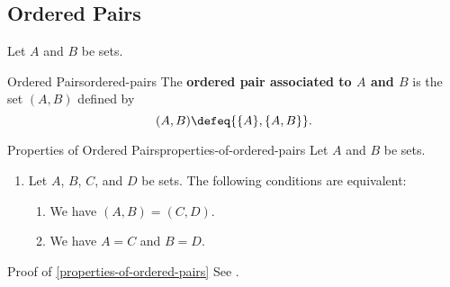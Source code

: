 \subsection{Ordered Pairs}\label{subsection-ordered-pairs}
Let $A$ and $B$ be sets.%
\begin{definition}{Ordered Pairs}{ordered-pairs}%
    The \textbf{ordered pair associated to $A$ and $B$} is the set $(A,B)$ defined by%
    \[
        (A,B)%
        \defeq%
        \{\{A\},\{A,B\}\}.%
    \]%
\end{definition}
\begin{proposition}{Properties of Ordered Pairs}{properties-of-ordered-pairs}%
    Let $A$ and $B$ be sets.%
    \begin{enumerate}
        \item\label{properties-of-ordered-pairs-uniqueness}Let $A$, $B$, $C$, and $D$ be sets. The following conditions are equivalent:
            \begin{enumerate}
                \item\label{properties-of-ordered-pairs-uniqueness-1}We have $(A,B)=(C,D)$.
                \item\label{properties-of-ordered-pairs-uniqueness-2}We have $A=C$ and $B=D$.
            \end{enumerate}
    \end{enumerate}
\end{proposition}
\begin{Proof}{Proof of \cref{properties-of-ordered-pairs}}%
    See \cite[Theorem 1.2.3]{ciesielski1997set}.
\end{Proof}
